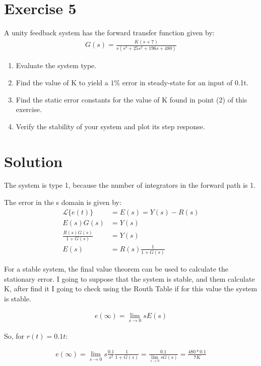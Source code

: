 \documentclass[a4paper]{article}
\begin{document}
\section*{Exercise 5}
A unity feedback system has the forward transfer function given by:
\begin{align}
    G(s) = \frac{K(s+7)}{s(s^3+25s^2+196s+480)} 
\end{align}
\begin{enumerate}
    \item Evaluate the system type.
    \item Find the value of K to yield a $1\%$ error in steady-state for an input of 0.1t.
    \item Find the static error constants for the value of K found in point (2) of this exercise.
    \item Verify the stability of your system and plot its step response.
\end{enumerate}
\section*{Solution}

The system is type 1, because the number of integrators in the forward path is 1.

The error in the s domain is given by:
\begin{align*}
    \mathcal{L}\{e(t)\}&=E(s)=Y(s)-R(s)\\
    E(s)G(s) &= Y(s)\\
    \frac{R(s)G(s)}{1+G(s)}&=Y(s)\\
    E(s) &= R(s)\frac{1}{1+G(s)}
\end{align*}

For a stable system, the final value theorem can be used to calculate the stationary error. I going to suppose that the system is stable, and them calculate K, after find it I going to check using the Routh Table if for this value the system is stable.

\begin{align}
    e(\infty)=\lim_{s\rightarrow 0}sE(s)
\end{align}

So, for $r(t) = 0.1 t$:

\begin{align*}
e(\infty)=\lim_{s \rightarrow 0}s\frac{0.1}{s^2}\frac{1}{1+G(s)}=\frac{0.1}{\lim_{s\rightarrow 0}sG(s)}=\frac{480*0.1}{7K}\\
\end{align*}
\end{document}
